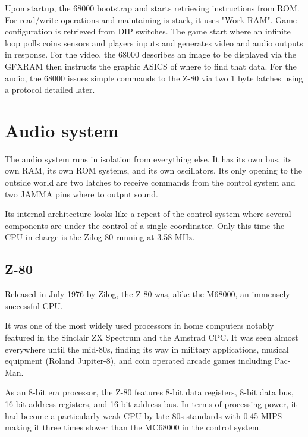 Upon startup, the 68000 bootstrap and starts retrieving instructions from ROM. For read/write operations and maintaining is stack, it uses "Work RAM". Game configuration is retrieved from DIP switches. The game start where an infinite loop polls coins sensors and players inputs and generates video and audio outputs in response. For the video, the 68000 describes an image to be displayed via the GFXRAM then instructs the graphic ASICS of where to find that data. For the audio, the 68000 issues simple commands to the Z-80 via two 1 byte latches using a protocol detailed later.
  











\pagebreak
\section{Audio system}
The audio system runs in isolation from everything else. It has its own bus, its own RAM, its own ROM systems, and its own oscillators. Its only opening to the outside world are two latches to receive commands from the control system and two JAMMA pins where to output sound.

Its internal architecture looks like a repeat of the control system where several components are under the control of a single coordinator. Only this time the CPU in charge is the Zilog-80 running at 3.58 MHz.

\subsection{Z-80}
Released in July 1976 by Zilog, the Z-80 was, alike the M68000, an immensely successful CPU. 

It was one of the most widely used processors in home computers notably featured in the Sinclair ZX Spectrum and the Amstrad CPC. It was seen almost everywhere until the mid-80s, finding its way in military applications, musical equipment (Roland Jupiter-8), and coin operated arcade games including Pac-Man. 

As an 8-bit era processor, the Z-80 features 8-bit data registers, 8-bit data bus, 16-bit address registers, and 16-bit address bus. In terms of processing power, it had become a particularly weak CPU by late 80s standards with 0.45 MIPS making it three times slower than the MC68000 in the control system. 

